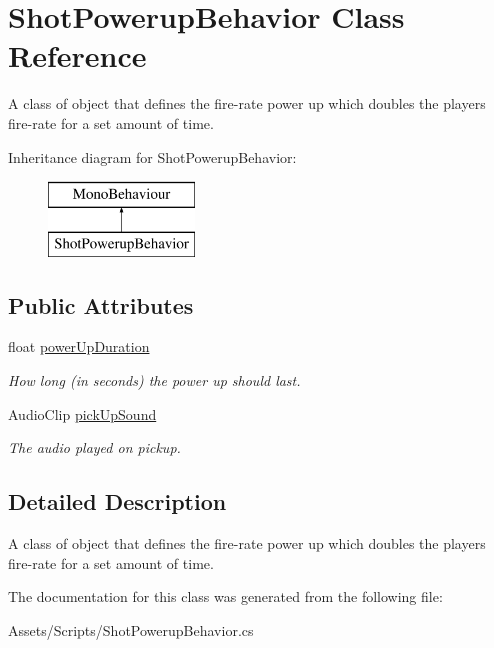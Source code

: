 \hypertarget{class_shot_powerup_behavior}{}\section{Shot\+Powerup\+Behavior Class Reference}
\label{class_shot_powerup_behavior}


A class of object that defines the fire-\/rate power up which doubles the player\textquotesingle{}s fire-\/rate for a set amount of time.  


Inheritance diagram for Shot\+Powerup\+Behavior\+:\begin{figure}[H]
\begin{center}
\leavevmode
\includegraphics[height=2.000000cm]{class_shot_powerup_behavior}
\end{center}
\end{figure}
\subsection*{Public Attributes}
\begin{DoxyCompactItemize}
\item 
\mbox{\label{class_shot_powerup_behavior_aae016007c1f9cf0f78fec0278c853666}} 
float \mbox{\hyperlink{class_shot_powerup_behavior_aae016007c1f9cf0f78fec0278c853666}{power\+Up\+Duration}}
\begin{DoxyCompactList}\small\item\em How long (in seconds) the power up should last. \end{DoxyCompactList}\item 
\mbox{\label{class_shot_powerup_behavior_a0b865b0b14261d875a66d839358408b3}} 
Audio\+Clip \mbox{\hyperlink{class_shot_powerup_behavior_a0b865b0b14261d875a66d839358408b3}{pick\+Up\+Sound}}
\begin{DoxyCompactList}\small\item\em The audio played on pickup. \end{DoxyCompactList}\end{DoxyCompactItemize}


\subsection{Detailed Description}
A class of object that defines the fire-\/rate power up which doubles the player\textquotesingle{}s fire-\/rate for a set amount of time. 

The documentation for this class was generated from the following file\+:\begin{DoxyCompactItemize}
\item 
Assets/\+Scripts/Shot\+Powerup\+Behavior.\+cs\end{DoxyCompactItemize}
